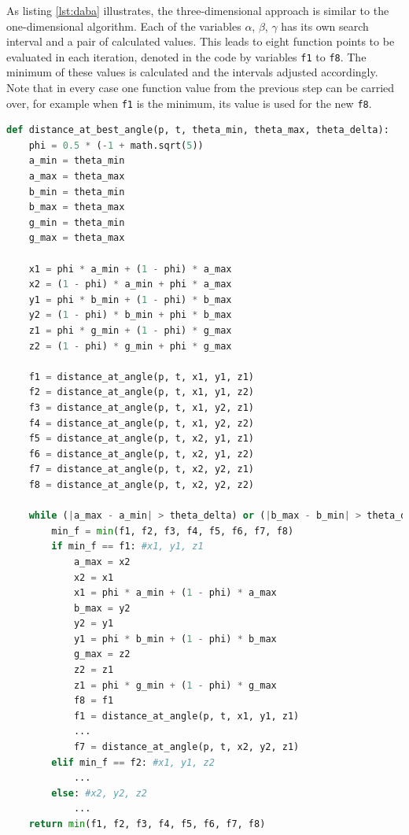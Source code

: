 As listing \ref{lst:daba} illustrates, the three-dimensional approach is similar to the one-dimensional algorithm. Each of the variables $\alpha$, $\beta$, $\gamma$ has its own search interval and a pair of calculated values. This leads to eight function points to be evaluated in each iteration, denoted in the code by variables \texttt{f1} to \texttt{f8}. The minimum of these values is calculated and the intervals adjusted accordingly. Note that in every case one function value from the previous step can be carried over, for example when \texttt{f1} is the minimum, its value is used for the new \texttt{f8}.

\begin{lstlisting}[label=lst:daba,language=python,frame=lt,caption=Three-dimensional Golden Section Search for finding the best angle between a candidate gesture and a template]
def distance_at_best_angle(p, t, theta_min, theta_max, theta_delta):
	phi = 0.5 * (-1 + math.sqrt(5))
	a_min = theta_min
	a_max = theta_max
	b_min = theta_min
	b_max = theta_max
	g_min = theta_min
	g_max = theta_max

	x1 = phi * a_min + (1 - phi) * a_max
	x2 = (1 - phi) * a_min + phi * a_max
	y1 = phi * b_min + (1 - phi) * b_max
	y2 = (1 - phi) * b_min + phi * b_max
	z1 = phi * g_min + (1 - phi) * g_max
	z2 = (1 - phi) * g_min + phi * g_max	

	f1 = distance_at_angle(p, t, x1, y1, z1)
	f2 = distance_at_angle(p, t, x1, y1, z2)
	f3 = distance_at_angle(p, t, x1, y2, z1)
	f4 = distance_at_angle(p, t, x1, y2, z2)
	f5 = distance_at_angle(p, t, x2, y1, z1)
	f6 = distance_at_angle(p, t, x2, y1, z2)
	f7 = distance_at_angle(p, t, x2, y2, z1)
	f8 = distance_at_angle(p, t, x2, y2, z2)

	while (|a_max - a_min| > theta_delta) or (|b_max - b_min| > theta_delta) or (|g_max - g_min| > theta_delta):	
		min_f = min(f1, f2, f3, f4, f5, f6, f7, f8)
		if min_f == f1: #x1, y1, z1
			a_max = x2
			x2 = x1
			x1 = phi * a_min + (1 - phi) * a_max
			b_max = y2
			y2 = y1
			y1 = phi * b_min + (1 - phi) * b_max
			g_max = z2
			z2 = z1
			z1 = phi * g_min + (1 - phi) * g_max
			f8 = f1
			f1 = distance_at_angle(p, t, x1, y1, z1)
			...
			f7 = distance_at_angle(p, t, x2, y2, z1)
		elif min_f == f2: #x1, y1, z2
			...
		else: #x2, y2, z2
			...
	return min(f1, f2, f3, f4, f5, f6, f7, f8)
\end{lstlisting}

